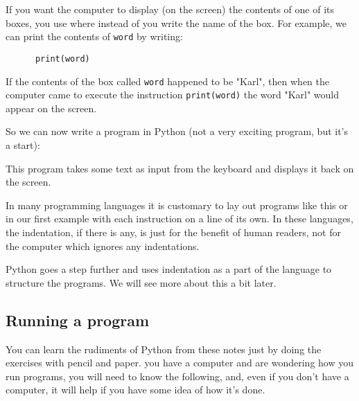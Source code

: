 
If you want the computer to display (on the screen) the contents of one of
its boxes, you use  where instead of 
you write the name of the box.  For example, we can print the contents of
\verb!word! by writing:

\begin{Verbatim}
      print(word)
\end{Verbatim}

If the contents of the box called \verb!word! happened to be "Karl", then when the
computer came to execute the instruction \verb!print(word)! the word "Karl" would appear
on the screen.  



So we can now write a program in Python (not a very exciting program,
but it's a start):


This program takes some text as input from the keyboard and displays it
back on the screen.

In many programming languages it is customary to lay out programs like this
or in our first example with each instruction on a line of its own.
In these languages, the indentation, if there is any, is just for the benefit
of human readers, not for the computer which ignores any indentations.

Python goes a step further and uses indentation as a part of the language
to structure the programs. We will see more about this a bit later.


\subsection{Running a program}

You can learn the rudiments of Python from these notes just by doing the
exercises with pencil and paper.
you have a computer and are wondering how
you run
programs, you will need to know the following, and, even if you don't have
a computer, it will help if you have some idea of how it's done.

